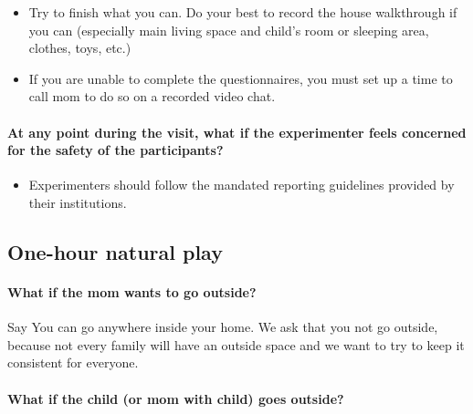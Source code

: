 \documentclass[
  12pt,
]{book}
\providecommand{\tightlist}{%
  \setlength{\itemsep}{0pt}\setlength{\parskip}{0pt}}
\begin{document}
\begin{itemize}
\tightlist
\item
  Try to finish what you can. Do your best to record the house walkthrough if you can (especially main living space and child's room or sleeping area, clothes, toys, etc.)
\item
  If you are unable to complete the questionnaires, you must set up a time to call mom to do so on a recorded video chat.
\end{itemize}

\hypertarget{at-any-point-during-the-visit-what-if-the-experimenter-feels-concerned-for-the-safety-of-the-participants}{%
\paragraph*{At any point during the visit, what if the experimenter feels concerned for the safety of the participants?}\label{at-any-point-during-the-visit-what-if-the-experimenter-feels-concerned-for-the-safety-of-the-participants}}

\begin{itemize}
\tightlist
\item
  Experimenters should follow the mandated reporting guidelines provided by their institutions.
\end{itemize}

\hypertarget{one-hour-natural-play}{%
\subsection{One-hour natural play}\label{one-hour-natural-play}}

\hypertarget{what-if-the-mom-wants-to-go-outside}{%
\paragraph*{What if the mom wants to go outside?}\label{what-if-the-mom-wants-to-go-outside}}

Say You can go anywhere inside your home. We ask that you not go outside, because not every family will have an outside space and we want to try to keep it consistent for everyone.

\hypertarget{what-if-the-child-or-mom-with-child-goes-outside}{%
\paragraph*{What if the child (or mom with child) goes outside?}\label{what-if-the-child-or-mom-with-child-goes-outside}}
\end{document}
